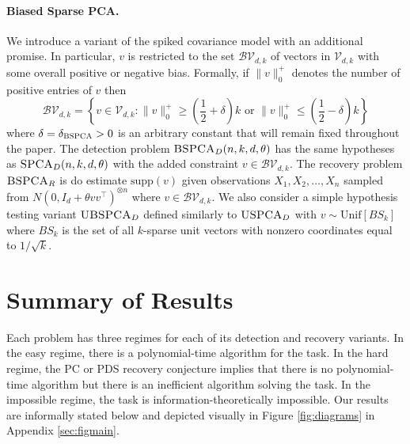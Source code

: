\paragraph{Biased Sparse PCA.} We introduce a variant of the spiked covariance model with an additional promise. In particular, $v$ is restricted to the set $\mathcal{BV}_{d, k}$ of vectors in $\mathcal{V}_{d,k}$ with some overall positive or negative bias. Formally, if $\| v \|_0^+$ denotes the number of positive entries of $v$ then
$$\mathcal{BV}_{d, k} = \left\{ v \in \mathcal{V}_{d, k} : \| v \|_0^+ \ge \left( \frac{1}{2} + \delta \right) k \text{ or } \| v \|_0^+ \le \left( \frac{1}{2} - \delta \right) k \right\}$$
where $\delta = \delta_{\textsc{BSPCA}} > 0$ is an arbitrary constant that will remain fixed throughout the paper. The detection problem $\textsc{BSPCA}_D(n, k, d, \theta)$ has the same hypotheses as $\textsc{SPCA}_D(n, k, d, \theta)$ with the added constraint $v \in \mathcal{BV}_{d, k}$. The recovery problem $\textsc{BSPCA}_R$ is do estimate $\text{supp}(v)$ given observations $X_1, X_2, \dots, X_n$ sampled from $N\left(0, I_d + \theta vv^\top\right)^{\otimes n}$ where $v \in \mathcal{BV}_{d, k}$. We also consider a simple hypothesis testing variant $\textsc{UBSPCA}_D$ defined similarly to $\textsc{USPCA}_D$ with $v \sim \text{Unif}[BS_k]$ where $BS_k$ is the set of all $k$-sparse unit vectors with nonzero coordinates equal to $1/\sqrt{k}$.

\section{Summary of Results}

Each problem has three regimes for each of its detection and recovery variants. In the easy regime, there is a polynomial-time algorithm for the task. In the hard regime, the PC or PDS recovery conjecture implies that there is no polynomial-time algorithm but there is an inefficient algorithm solving the task. In the impossible regime, the task is information-theoretically impossible.
Our results are informally stated below and depicted visually in Figure \ref{fig:diagrams} in Appendix \ref{sec:figmain}.

